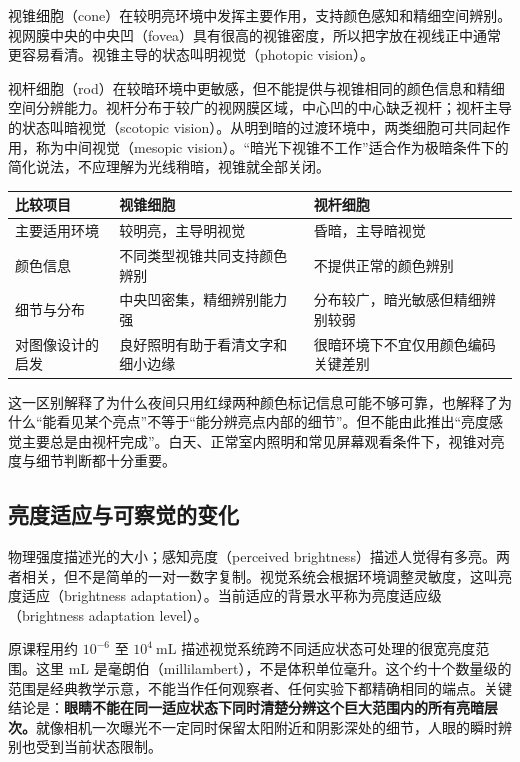 视锥细胞（cone）在较明亮环境中发挥主要作用，支持颜色感知和精细空间辨别。视网膜中央的中央凹（fovea）具有很高的视锥密度，所以把字放在视线正中通常更容易看清。视锥主导的状态叫明视觉（photopic vision）。

视杆细胞（rod）在较暗环境中更敏感，但不能提供与视锥相同的颜色信息和精细空间分辨能力。视杆分布于较广的视网膜区域，中心凹的中心缺乏视杆；视杆主导的状态叫暗视觉（scotopic vision）。从明到暗的过渡环境中，两类细胞可共同起作用，称为中间视觉（mesopic vision）。“暗光下视锥不工作”适合作为极暗条件下的简化说法，不应理解为光线稍暗，视锥就全部关闭。

\begin{center}
\begin{tabularx}{\linewidth}{@{}p{2.1cm}XX@{}}
\toprule
比较项目 & 视锥细胞 & 视杆细胞\\
\midrule
主要适用环境 & 较明亮，主导明视觉 & 昏暗，主导暗视觉\\
颜色信息 & 不同类型视锥共同支持颜色辨别 & 不提供正常的颜色辨别\\
细节与分布 & 中央凹密集，精细辨别能力强 & 分布较广，暗光敏感但精细辨别较弱\\
对图像设计的启发 & 良好照明有助于看清文字和细小边缘 & 很暗环境下不宜仅用颜色编码关键差别\\
\bottomrule
\end{tabularx}
\end{center}

这一区别解释了为什么夜间只用红绿两种颜色标记信息可能不够可靠，也解释了为什么“能看见某个亮点”不等于“能分辨亮点内部的细节”。但不能由此推出“亮度感觉主要总是由视杆完成”。白天、正常室内照明和常见屏幕观看条件下，视锥对亮度与细节判断都十分重要。

\subsection{亮度适应与可察觉的变化}

物理强度描述光的大小；感知亮度（perceived brightness）描述人觉得有多亮。两者相关，但不是简单的一对一数字复制。视觉系统会根据环境调整灵敏度，这叫亮度适应（brightness adaptation）。当前适应的背景水平称为亮度适应级（brightness adaptation level）。

原课程用约 $10^{-6}$ 至 $10^4\ \mathrm{mL}$ 描述视觉系统跨不同适应状态可处理的很宽亮度范围。这里 $\mathrm{mL}$ 是毫朗伯（millilambert），不是体积单位毫升。这个约十个数量级的范围是经典教学示意，不能当作任何观察者、任何实验下都精确相同的端点。关键结论是：\textbf{眼睛不能在同一适应状态下同时清楚分辨这个巨大范围内的所有亮暗层次。}就像相机一次曝光不一定同时保留太阳附近和阴影深处的细节，人眼的瞬时辨别也受到当前状态限制。

